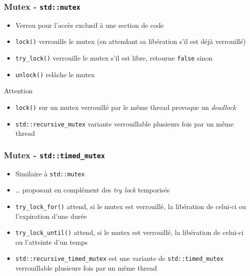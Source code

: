 \documentclass[C++.tex]{subfiles}
\begin{document}
\begin{frame}[fragile]
	\frametitle{Mutex - \lstinline|std::mutex|}
	\begin{itemize}
		\item Verrou pour l'accès exclusif à une section de code
		\item \lstinline|lock()| verrouille le mutex (en attendant sa libération s'il est déjà verrouillé)
		\item \lstinline|try_lock()| verrouille le mutex s'il est libre, retourne \lstinline|false| sinon
		\item \lstinline|unlock()| relâche le mutex
	\end{itemize}

	\begin{alertblock}{Attention}
		\begin{itemize}
			\item \lstinline|lock()| sur un mutex verrouillé par le même thread provoque un \textit{deadlock}
		\end{itemize}
	\end{alertblock}

	\begin{itemize}
		\item \lstinline|std::recursive_mutex| variante verrouillable plusieurs fois par un même thread

	\end{itemize}
\end{frame}

\begin{frame}[fragile]
	\frametitle{Mutex - \lstinline|std::timed_mutex|}
	\begin{itemize}
		\item Similaire à \lstinline|std::mutex|
		\item \ldots{} proposant en complément des \textit{try lock} temporisés
		\item \lstinline|try_lock_for()| attend, si le mutex est verrouillé, la libération de celui-ci ou l'expiration d'une durée
		\item \lstinline|try_lock_until()| attend, si le mutex est verrouillé, la libération de celui-ci ou l'atteinte d'un temps
		\item \lstinline|std::recursive_timed_mutex| est une variante de \lstinline|std::timed_mutex| verrouillable plusieurs fois par un même thread
	\end{itemize}
\end{frame}
\end{document}
